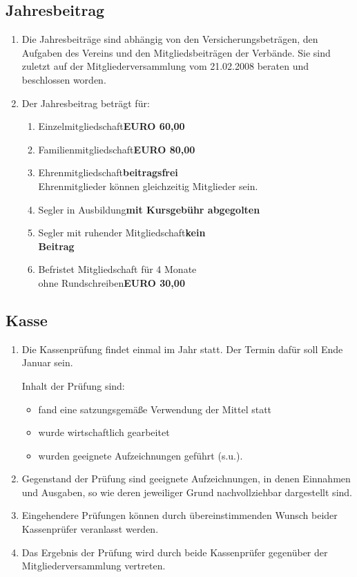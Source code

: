 \documentclass[10pt, twocolumn, parskip=half]{scrartcl}
\begin{document}
\subsection{Jahresbeitrag}
\begin{enumerate}[noitemsep]
	\item Die Jahresbeiträge sind abhängig von den Versicherungsbeträgen, den Aufgaben des Vereins und den Mitgliedsbeiträgen der Verbände. Sie sind zuletzt auf der Mitgliederversammlung vom 21.02.2008 beraten und beschlossen worden.
	\item Der Jahresbeitrag beträgt für:
		\begin{enumerate}[noitemsep]
			\item Einzelmitgliedschaft\dotfill \textbf{EURO 60,00}
			\item Familienmitgliedschaft\dotfill \textbf{EURO 80,00}
			\item Ehrenmitgliedschaft\dotfill \textbf{beitragsfrei}\\
			Ehrenmitglieder können gleichzeitig Mitglieder sein.
			\item Segler in Ausbildung\dotfill \textbf{mit Kursgebühr abgegolten}
			\item Segler mit ruhender Mitgliedschaft\dotfill \textbf{kein\\Beitrag}
			\item Befristet Mitgliedschaft für 4 Monate \\ohne Rundschreiben\dotfill \textbf{EURO 30,00}
		\end{enumerate}
\end{enumerate}

\subsection{Kasse}
\begin{enumerate}[noitemsep]
	\item Die Kassenprüfung findet einmal im Jahr statt. Der Termin dafür soll Ende Januar sein.
	
	Inhalt der Prüfung sind:
		\begin{itemize}[noitemsep]
			\item fand eine satzungsgemäße Verwendung der Mittel statt
			\item wurde wirtschaftlich gearbeitet
			\item wurden geeignete Aufzeichnungen geführt (s.u.).
		\end{itemize}
	\item Gegenstand der Prüfung sind geeignete Aufzeichnungen, in denen Einnahmen und Ausgaben, so wie deren jeweiliger Grund nachvollziehbar dargestellt sind.
	\item Eingehendere Prüfungen können durch übereinstimmenden Wunsch beider Kassenprüfer veranlasst werden.
	\item Das Ergebnis der Prüfung wird durch beide Kassenprüfer gegenüber der Mitgliederversammlung vertreten.	
\end{enumerate}
\end{document}
